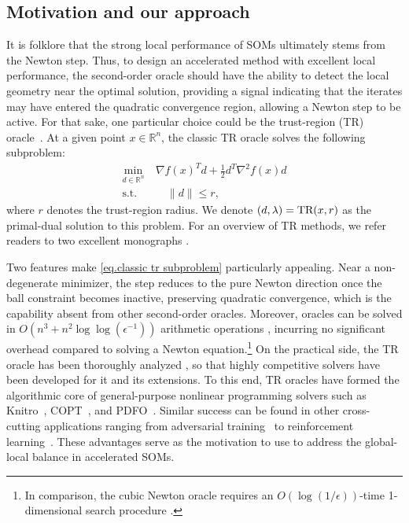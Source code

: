 \subsection{Motivation and our approach}\label{sec.motivation}
It is folklore that the strong local performance of SOMs ultimately stems from the Newton step. Thus, to design an accelerated method with excellent local performance, the second-order oracle should have the ability to detect the local geometry near the optimal solution, providing a signal indicating that the iterates may have
entered the quadratic convergence region, allowing a Newton step to be active.
For that sake, one particular choice could be the trust-region (TR) oracle~\cite{More1983,conn2000trust}. At a given point \( x \in \mathbb{R}^n \), the classic TR oracle solves the following subproblem:
\begin{equation}
    \label{eq.classic tr subproblem}
    \begin{aligned}
        \underset{d \in \mathbb{R}^n}{\min}~ & \nabla f(x)^T d + \tfrac{1}{2} d^T \nabla^2 f(x)  d \\
        \text{s.t.}                          & \quad  \|d\| \le r,
    \end{aligned}
\end{equation}
where \( r \) denotes the trust-region radius. We denote $(d,\lambda) = \textrm{TR}(x, r)$ as the primal-dual solution to this problem. For an overview of TR methods, we refer readers to two excellent monographs \cite{yuan2000review,yuan2015recent}.

Two features make \eqref{eq.classic tr subproblem} particularly appealing. Near a non-degenerate minimizer, the step reduces to the pure Newton direction once the ball constraint becomes inactive, preserving quadratic convergence, which is the capability absent from other second-order oracles. 
Moreover, \tr{} oracles can be solved in $O(n^3 + n^2\log\log(\epsilon^{-1}))$ arithmetic operations \cite{vavasisProvingPolynomialtimeSphereconstrained1990,yenewcomplexityresult1991}, incurring no significant overhead compared to solving a Newton equation.\footnote{In comparison, the cubic Newton oracle requires an $O\left(\log\left(1/\epsilon\right)\right)$-time 1-dimensional search procedure \cite{nesterov2006cubic,cartisChapter8Subproblem2022}.}
On the practical side, the TR oracle has been thoroughly analyzed \cite{jiangHolderianErrorBounds2022,rojasNewMatrixfreeAlgorithm2001}, so that highly competitive solvers have been developed \cite{rojasNewMatrixfreeAlgorithm2001, adachiSolvingTrustregionSubproblem2017, adachiEigenvaluebasedAlgorithmAnalysis2019} for it and its extensions.
To this end, TR oracles have formed the algorithmic core of general-purpose nonlinear programming solvers such as Knitro~\cite{byrd2006k}, COPT~\cite{geCardinalOptimizerCOPT2022}, and PDFO~\cite{ragonneau2024pdfo}. Similar success can be found in other cross-cutting applications ranging from adversarial training~\cite{yao2019trust} to reinforcement learning~\cite{schulman2015trust}. These advantages serve as the motivation to use \tr{} to address the global-local balance in accelerated SOMs.


